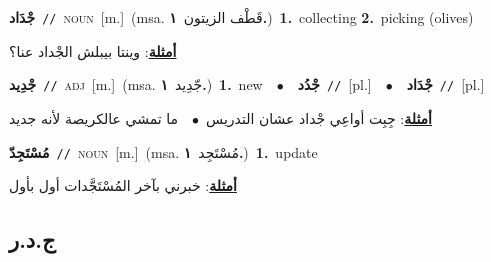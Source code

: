 \documentclass[10pt,a4paper,twoside]{article} %
\begin{document}
\begin{multicols}{2}
{\setlength\topsep{0pt}\textbf{\foreignlanguage{arabic}{جْدَاد}}\ {\color{gray}\texttt{//}\color{black}}\ \textsc{noun}\ [m.]\ \color{gray}(msa. \foreignlanguage{arabic}{قَطْف الزيتون}~\foreignlanguage{arabic}{\textbf{١.}})\color{black}\ \textbf{1.}~collecting  \textbf{2.}~picking (olives)\  \begin{flushright}\color{gray}\foreignlanguage{arabic}{\textbf{\underline{\foreignlanguage{arabic}{أمثلة}}}: وينتا بيبلش الجْداد عنا؟}\end{flushright}\color{black}} \vspace{2mm}

{\setlength\topsep{0pt}\textbf{\foreignlanguage{arabic}{جْدِيد}}\ {\color{gray}\texttt{//}\color{black}}\ \textsc{adj}\ [m.]\ \color{gray}(msa. \foreignlanguage{arabic}{جّدِيد}~\foreignlanguage{arabic}{\textbf{١.}})\color{black}\ \textbf{1.}~new\ \ $\bullet$\ \ \setlength\topsep{0pt}\textbf{\foreignlanguage{arabic}{جْدُد}}\ {\color{gray}\texttt{//}\color{black}}\ [pl.]\ \ $\bullet$\ \ \setlength\topsep{0pt}\textbf{\foreignlanguage{arabic}{جْدَاد}}\ {\color{gray}\texttt{//}\color{black}}\ [pl.]\  \begin{flushright}\color{gray}\foreignlanguage{arabic}{\textbf{\underline{\foreignlanguage{arabic}{أمثلة}}}: جِبِت أواعِي جْداد عشان التدريس\ $\bullet$\ \  ما تمشي عالكريصة لأنه جديد}\end{flushright}\color{black}} \vspace{2mm}

{\setlength\topsep{0pt}\textbf{\foreignlanguage{arabic}{مُسْتَجِدّ}}\ {\color{gray}\texttt{//}\color{black}}\ \textsc{noun}\ [m.]\ \color{gray}(msa. \foreignlanguage{arabic}{مُسْتَجِد}~\foreignlanguage{arabic}{\textbf{١.}})\color{black}\ \textbf{1.}~update\  \begin{flushright}\color{gray}\foreignlanguage{arabic}{\textbf{\underline{\foreignlanguage{arabic}{أمثلة}}}: خبرني بآخر المُسْتَجَّدات أول بأول}\end{flushright}\color{black}} \vspace{2mm}

\vspace{-3mm}
\subsection*{\color{blue}\foreignlanguage{arabic}{ج.د.ر}\color{blue}{}} 


\end{multicols}
\end{document}
